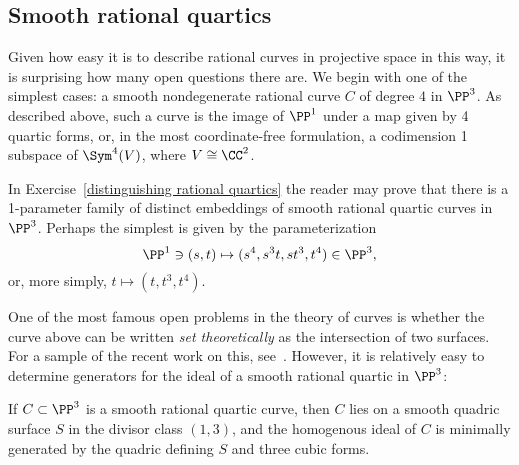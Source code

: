\subsection *{Smooth rational quartics}
Given how easy it is to describe rational curves in projective space in this way, it is surprising how many open questions there are. We begin with
one of the simplest cases: a smooth nondegenerate rational curve $C$ of degree $4$ in $\PP^3$.
As described above, such a curve is the image of $\PP^1$ under a map given by 4 quartic forms,
or, in the most coordinate-free formulation, a codimension 1 subspace of $\Sym^4(V)$, where
$V\cong \CC^2$. 

\begin{example}
In Exercise~\ref{distinguishing rational quartics} the reader may prove that there is a 1-parameter family of distinct embeddings of smooth rational quartic curves in $\PP^3$. Perhaps the simplest is given by the parameterization 
$$
\PP^1 \ni (s,t) \mapsto (s^4, s^3t, st^3, t^4)\in \PP^3,
$$
or, more simply, $t\mapsto(t, t^3, t^4)$. 
\end{example}


One of the most famous open problems in the theory of curves is whether the curve above
can be written \emph{set theoretically} as the intersection of two surfaces. For a sample of the recent
work on this, see~\cite{MR3356940}. However, it is relatively easy to determine generators for the
ideal of a smooth rational quartic in $\PP^3$:


\begin{proposition}\label{ideal of rational quartic}
If $C\subset \PP^3$ is a smooth rational quartic curve, then $C$ lies on a smooth quadric
surface $S$ in the divisor class $(1,3)$, and the homogenous ideal of $C$ is minimally
generated by the quadric defining $S$ and three cubic forms.
\end{proposition}

